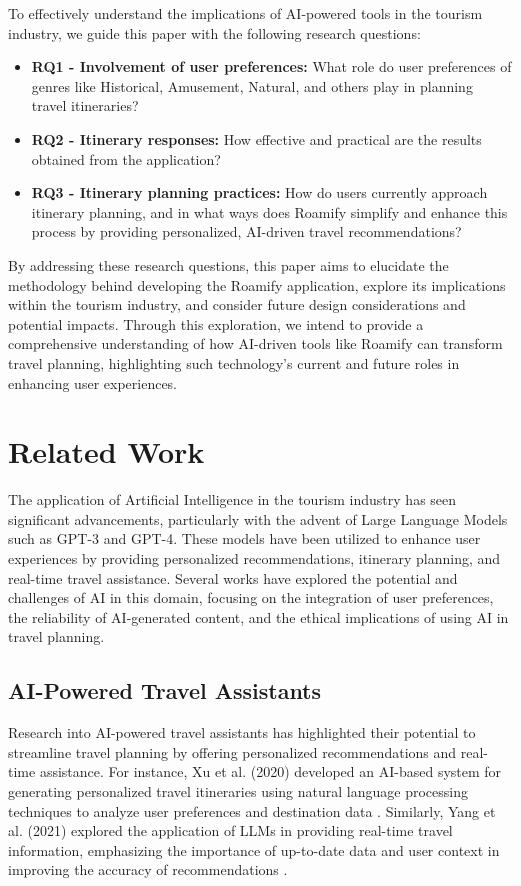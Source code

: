 \documentclass[sigconf,authordraft]{acmart}
\begin{document}
To effectively understand the implications of AI-powered tools in the tourism industry, we guide this paper with the following research questions:

\begin{itemize}
    \item \textbf{RQ1 - Involvement of user preferences:} What role do user preferences of genres like Historical, Amusement, Natural, and others play in planning travel itineraries?
    \item \textbf{RQ2 - Itinerary responses:} How effective and practical are the results obtained from the application?
    \item \textbf{RQ3 - Itinerary planning practices:} How do users currently approach itinerary planning, and in what ways does Roamify simplify and enhance this process by providing personalized, AI-driven travel recommendations?
\end{itemize}

By addressing these research questions, this paper aims to elucidate the methodology behind developing the Roamify application, explore its implications within the tourism industry, and consider future design considerations and potential impacts. Through this exploration, we intend to provide a comprehensive understanding of how AI-driven tools like Roamify can transform travel planning, highlighting such technology's current and future roles in enhancing user experiences.

\section{Related Work}

The application of Artificial Intelligence in the tourism industry has seen significant advancements, particularly with the advent of Large Language Models such as GPT-3 and GPT-4. These models have been utilized to enhance user experiences by providing personalized recommendations, itinerary planning, and real-time travel assistance. Several works have explored the potential and challenges of AI in this domain, focusing on the integration of user preferences, the reliability of AI-generated content, and the ethical implications of using AI in travel planning.

\subsection{AI-Powered Travel Assistants}
Research into AI-powered travel assistants has highlighted their potential to streamline travel planning by offering personalized recommendations and real-time assistance. For instance, Xu et al. (2020) developed an AI-based system for generating personalized travel itineraries using natural language processing techniques to analyze user preferences and destination data \cite{xu2020personalized}. Similarly, Yang et al. (2021) explored the application of LLMs in providing real-time travel information, emphasizing the importance of up-to-date data and user context in improving the accuracy of recommendations \cite{yang2021real}.
\end{document}
